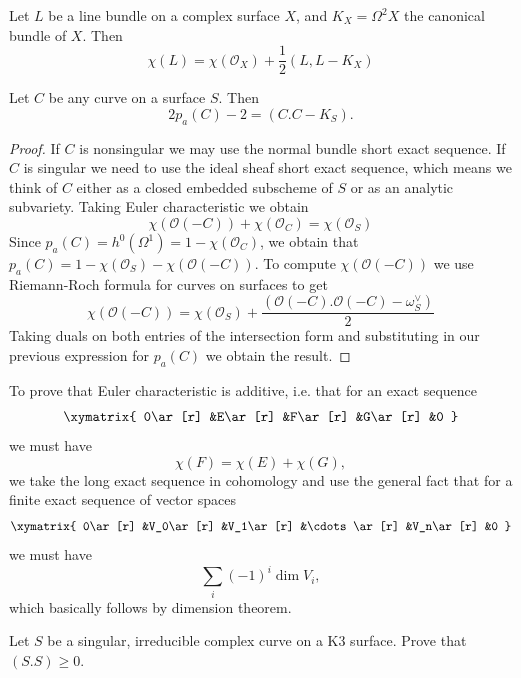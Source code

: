 \documentclass{book}
\begin{document}
\begin{theorem}
\label{theorem-riema-roch-line-bundl-surfa}
Let $L$ be a line bundle on a complex surface
$X$, and $K_X=\Omega^2X$ the
canonical bundle of $X$. Then
\begin{equation}
\label{equation-riema-roch-line-bundl-surf}
\chi(L)=\chi(\mathcal{O}_X)+\frac{1}{2}(L,L-
K_X)
\end{equation}
\end{theorem}

\begin{lemma}
\label{lemma-genus-formula}
Let $C$ be any curve on a surface $S$. Then
\begin{equation}
\label{equation-genus-formula}
2p_a(C)-2=(C.C-K_S).
\end{equation}
\end{lemma}

\begin{proof}
If $C$ is nonsingular we may use the normal
bundle short exact sequence. If $C$ is
singular we need to use the ideal sheaf short
exact sequence, which means we think of $C$
either as a closed embedded subscheme of $S$
or as an analytic subvariety. Taking Euler
characteristic we obtain
$$
\chi(\mathcal{O}(-C))+\chi(\mathcal{O}_C)=
\chi(\mathcal{O}_S)
$$
Since $p_a(C)=h^0(\Omega^1)
=1-\chi(\mathcal{O}_C)$, we
obtain that
$p_a(C)=1-\chi(\mathcal{O}_S)-
\chi(\mathcal{O}(-C))$.
To compute $\chi(\mathcal{O}(-C))$ we use
Riemann-Roch formula for curves on surfaces
to get
$$
\chi(\mathcal{O}(-C))=\chi(\mathcal{O}_S)
+\frac{(\mathcal{O}(-C).
\mathcal{O}(-C)-\omega_S^\vee)}{2}
$$
Taking duals on both entries of the
intersection form and substituting in our
previous expression for $p_a(C)$ we obtain
the result.
\end{proof}

\begin{remark}
\label{remark-euler-characteristic-additive}
To prove that Euler characteristic is
additive, i.e. that for an exact sequence
$$
\xymatrix{
0\ar[r]
&E\ar[r]
&F\ar[r]
&G\ar[r]
&0
}
$$
we must have
$$
\chi(F)=\chi(E)+\chi(G),
$$
we take the long exact sequence in cohomology
and use the general fact that for
a finite exact sequence of vector spaces
$$
\xymatrix{
0\ar[r]
&V_0\ar[r]
&V_1\ar[r]
&\cdots\ar[r]
&V_n\ar[r]
&0
}
$$
we must have
$$
\sum_i(-1)^i\dim V_i,
$$
which basically follows by dimension theorem.
\end{remark}

\begin{exercise}
\label{exercise-singular-curve-on-K3}
Let $S$ be a singular, irreducible complex
curve on a K3 surface. Prove that
$(S.S)\geq 0$.
\end{exercise}
\end{document}
